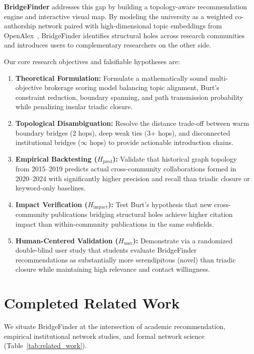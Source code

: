 \textbf{BridgeFinder} addresses this gap by building a topology-aware recommendation engine and interactive visual map. By modeling the university as a weighted co-authorship network paired with high-dimensional topic embeddings from OpenAlex~\cite{openalex}, BridgeFinder identifies structural holes across research communities and introduces users to complementary researchers on the other side. 

Our core research objectives and falsifiable hypotheses are:
\begin{enumerate}
    \setlength{\itemsep}{0.2pt}\setlength{\parskip}{0pt}
    \item \textbf{Theoretical Formulation:} Formulate a mathematically sound multi-objective brokerage scoring model balancing topic alignment, Burt's constraint reduction, boundary spanning, and path transmission probability while penalizing insular triadic closure.
    \item \textbf{Topological Disambiguation:} Resolve the distance trade-off between warm boundary bridges (2 hops), deep weak ties (3+ hops), and disconnected institutional bridges ($\infty$ hops) to provide actionable introduction chains.
    \item \textbf{Empirical Backtesting ($H_{\text{pred}}$):} Validate that historical graph topology from 2015--2019 predicts actual cross-community collaborations formed in 2020--2024 with significantly higher precision and recall than triadic closure or keyword-only baselines.
    \item \textbf{Impact Verification ($H_{\text{impact}}$):} Test Burt's hypothesis that new cross-community publications bridging structural holes achieve higher citation impact than within-community publications in the same subfields.
    \item \textbf{Human-Centered Validation ($H_{\text{user}}$):} Demonstrate via a randomized double-blind user study that students evaluate BridgeFinder recommendations as substantially more serendipitous (novel) than triadic closure while maintaining high relevance and contact willingness.
\end{enumerate}

\section{Completed Related Work}

We situate BridgeFinder at the intersection of academic recommendation, empirical institutional network studies, and formal network science (Table~\ref{tab:related_work}).

